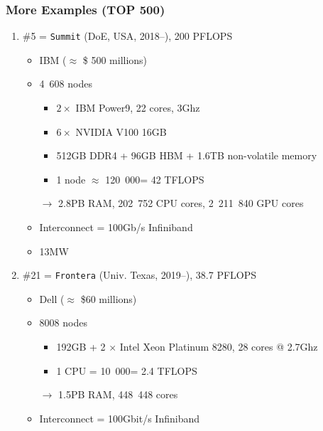 \documentclass[xcolor={x11names,svgnames,psnames}]{beamer}
\newcommand{\euro}{\EUR\xspace}
\begin{document}

\begin{frame}
  \frametitle{More Examples (TOP 500)}

  \begin{enumerate}
  \item \#5 = \texttt{Summit} (DoE, USA, 2018--), 200 PFLOPS
    \begin{itemize}
    \item IBM  ($\approx$ \$ 500 millions)
    \item 4~608 nodes
      \begin{itemize}
      \item $2 \times$ IBM Power9, 22 cores, 3Ghz
      \item $6 \times$ NVIDIA V100 16GB
      \item 512GB DDR4 + 96GB HBM + 1.6TB non-volatile memory
      \item 1 node $\approx$ 120~000\euro = 42 TFLOPS
      \end{itemize}
    \item[$\rightarrow$] 2.8PB RAM, 202~752 CPU cores, 2~211~840 GPU cores 
    \item Interconnect = 100Gb/s Infiniband 
    \item 13MW 
    \end{itemize}

    \medskip\pause

  \item \#21 = \texttt{Frontera} (Univ. Texas, 2019--), 38.7 PFLOPS
    \begin{itemize}
    \item Dell ($\approx$ \$60 millions)
    \item 8008 nodes
      \begin{itemize}
        \item 192GB + 2 $\times$ Intel Xeon Platinum 8280, 28 cores @ 2.7Ghz
        \item 1 CPU = 10~000\euro = 2.4 TFLOPS
        \end{itemize}
      \item[$\rightarrow$] 1.5PB RAM, 448~448 cores
    \item Interconnect = 100Gbit/s Infiniband 
    \end{itemize}
  \end{enumerate}
\end{frame}

\end{document}
